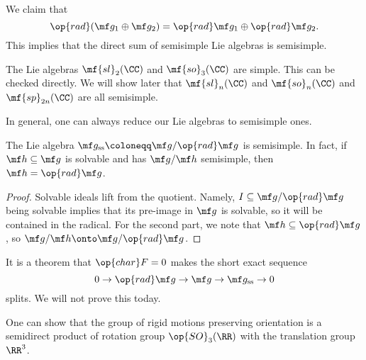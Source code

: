 \documentclass[../notes.tex]{subfiles}
\begin{document}
\begin{remark}
	We claim that
	\[\op{rad}(\mf g_1\oplus\mf g_2)=\op{rad}\mf g_1\oplus\op{rad}\mf g_2.\]
	This implies that the direct sum of semisimple Lie algebras is semisimple.
\end{remark}
\begin{example}
	The Lie algebras $\mf{sl}_2(\CC)$ and $\mf{so}_3(\CC)$ are simple. This can be checked directly. We will show later that $\mf{sl}_n(\CC)$ and $\mf{so}_n(\CC)$ and $\mf{sp}_{2n}(\CC)$ are all semisimple.
\end{example}
In general, one can always reduce our Lie algebras to semisimple ones.
\begin{lemma}
	The Lie algebra $\mf g_{\mathrm{ss}}\coloneqq\mf g/\op{rad}\mf g$ is semisimple. In fact, if $\mf h\subseteq\mf g$ is solvable and has $\mf g/\mf h$ semisimple, then $\mf h=\op{rad}\mf g$.
\end{lemma}
\begin{proof}
	Solvable ideals lift from the quotient. Namely, $I\subseteq\mf g/\op{rad}\mf g$ being solvable implies that its pre-image in $\mf g$ is solvable, so it will be contained in the radical. For the second part, we note that $\mf h\subseteq\op{rad}\mf g$, so $\mf g/\mf h\onto\mf g/\op{rad}\mf g$.
\end{proof}
\begin{remark}
	It is a theorem that $\op{char}F=0$ makes the short exact sequence
	\[0\to\op{rad}\mf g\to\mf g\to\mf g_{\mathrm{ss}}\to0\]
	splits. We will not prove this today.
\end{remark}
\begin{example}
	One can show that the group of rigid motions preserving orientation is a semidirect product of rotation group $\op{SO}_3(\RR)$ with the translation group $\RR^3$.
\end{example}
\end{document}
